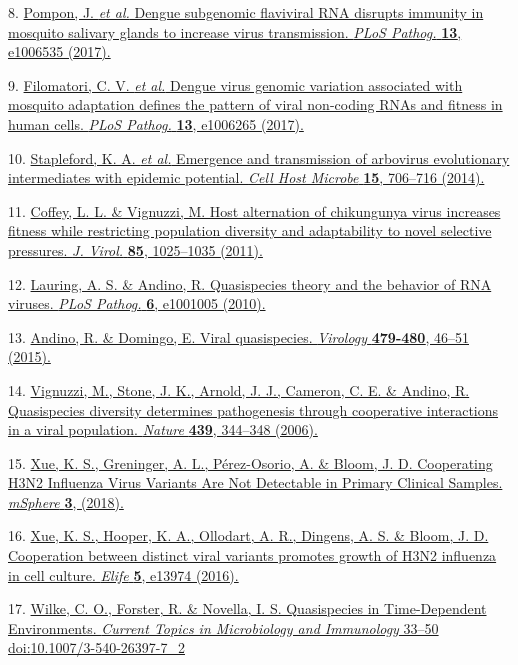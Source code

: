 \documentclass[
]{article}
\begin{document}
8. \href{http://paperpile.com/b/REZjPf/erQn1}{Pompon, J. \emph{et al.}
Dengue subgenomic flaviviral RNA disrupts immunity in mosquito salivary
glands to increase virus transmission. \emph{PLoS Pathog.} \textbf{13},
e1006535 (2017).}

9. \href{http://paperpile.com/b/REZjPf/mYIl}{Filomatori, C. V. \emph{et
al.} Dengue virus genomic variation associated with mosquito adaptation
defines the pattern of viral non-coding RNAs and fitness in human cells.
\emph{PLoS Pathog.} \textbf{13}, e1006265 (2017).}

10. \href{http://paperpile.com/b/REZjPf/uzXme}{Stapleford, K. A.
\emph{et al.} Emergence and transmission of arbovirus evolutionary
intermediates with epidemic potential. \emph{Cell Host Microbe}
\textbf{15}, 706--716 (2014).}

11. \href{http://paperpile.com/b/REZjPf/XqhpA}{Coffey, L. L. \&
Vignuzzi, M. Host alternation of chikungunya virus increases fitness
while restricting population diversity and adaptability to novel
selective pressures. \emph{J. Virol.} \textbf{85}, 1025--1035 (2011).}

12. \href{http://paperpile.com/b/REZjPf/fySKT}{Lauring, A. S. \& Andino,
R. Quasispecies theory and the behavior of RNA viruses. \emph{PLoS
Pathog.} \textbf{6}, e1001005 (2010).}

13. \href{http://paperpile.com/b/REZjPf/kVUH4}{Andino, R. \& Domingo, E.
Viral quasispecies. \emph{Virology} \textbf{479-480}, 46--51 (2015).}

14. \href{http://paperpile.com/b/REZjPf/ETeaC}{Vignuzzi, M., Stone, J.
K., Arnold, J. J., Cameron, C. E. \& Andino, R. Quasispecies diversity
determines pathogenesis through cooperative interactions in a viral
population. \emph{Nature} \textbf{439}, 344--348 (2006).}

15. \href{http://paperpile.com/b/REZjPf/lp4YG}{Xue, K. S., Greninger, A.
L., Pérez-Osorio, A. \& Bloom, J. D. Cooperating H3N2 Influenza Virus
Variants Are Not Detectable in Primary Clinical Samples. \emph{mSphere}
\textbf{3}, (2018).}

16. \href{http://paperpile.com/b/REZjPf/iU0v6}{Xue, K. S., Hooper, K.
A., Ollodart, A. R., Dingens, A. S. \& Bloom, J. D. Cooperation between
distinct viral variants promotes growth of H3N2 influenza in cell
culture. \emph{Elife} \textbf{5}, e13974 (2016).}

17. \href{http://paperpile.com/b/REZjPf/f5vgZ}{Wilke, C. O., Forster, R.
\& Novella, I. S. Quasispecies in Time-Dependent Environments.
\emph{Current Topics in Microbiology and Immunology} 33--50
doi:}\href{http://dx.doi.org/10.1007/3-540-26397-7_2}{10.1007/3-540-26397-7\_2}
\end{document}
